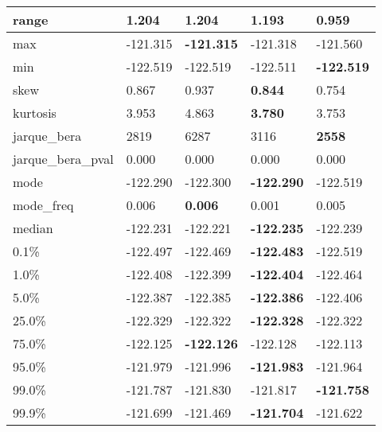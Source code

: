 \begin{table}[H]
\begin{tabular}{|l|m{10em}|m{10em}|m{10em}|m{10em}|}
\hline range & 1.204 & \bfseries 1.204 & 1.193 & \cellcolor[rgb]{0.9, 0.54, 0.52} 0.959 \\
\hline max & -121.315 & \bfseries -121.315 & -121.318 & \cellcolor[rgb]{0.9, 0.54, 0.52} -121.560 \\
\hline min & -122.519 & -122.519 & \cellcolor[rgb]{0.9, 0.54, 0.52} -122.511 & \bfseries -122.519 \\
\hline skew & 0.867 & 0.937 & \bfseries 0.844 & \cellcolor[rgb]{0.9, 0.54, 0.52} 0.754 \\
\hline kurtosis & 3.953 & \cellcolor[rgb]{0.9, 0.54, 0.52} 4.863 & \bfseries 3.780 & 3.753 \\
\hline jarque\_bera & 2819 & \cellcolor[rgb]{0.9, 0.54, 0.52} 6287 & 3116 & \bfseries 2558 \\
\hline jarque\_bera\_pval & 0.000 & 0.000 & 0.000 & 0.000 \\
\hline mode & -122.290 & -122.300 & \bfseries -122.290 & \cellcolor[rgb]{0.9, 0.54, 0.52} -122.519 \\
\hline mode\_freq & 0.006 & \bfseries 0.006 & \cellcolor[rgb]{0.9, 0.54, 0.52} 0.001 & 0.005 \\
\hline median & -122.231 & \cellcolor[rgb]{0.9, 0.54, 0.52} -122.221 & \bfseries -122.235 & -122.239 \\
\hline 0.1\% & -122.497 & \cellcolor[rgb]{0.9, 0.54, 0.52} -122.469 & \bfseries -122.483 & -122.519 \\
\hline 1.0\% & -122.408 & -122.399 & \bfseries -122.404 & \cellcolor[rgb]{0.9, 0.54, 0.52} -122.464 \\
\hline 5.0\% & -122.387 & -122.385 & \bfseries -122.386 & \cellcolor[rgb]{0.9, 0.54, 0.52} -122.406 \\
\hline 25.0\% & -122.329 & -122.322 & \bfseries -122.328 & \cellcolor[rgb]{0.9, 0.54, 0.52} -122.322 \\
\hline 75.0\% & -122.125 & \bfseries -122.126 & -122.128 & \cellcolor[rgb]{0.9, 0.54, 0.52} -122.113 \\
\hline 95.0\% & -121.979 & \cellcolor[rgb]{0.9, 0.54, 0.52} -121.996 & \bfseries -121.983 & -121.964 \\
\hline 99.0\% & -121.787 & \cellcolor[rgb]{0.9, 0.54, 0.52} -121.830 & -121.817 & \bfseries -121.758 \\
\hline 99.9\% & -121.699 & \cellcolor[rgb]{0.9, 0.54, 0.52} -121.469 & \bfseries -121.704 & -121.622 \\
\hline
\end{tabular}
\end{table}
